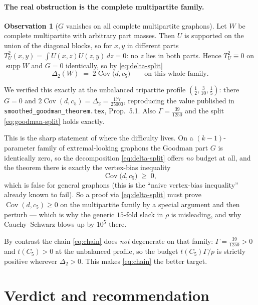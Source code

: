 \documentclass[11pt]{article}
\theoremstyle{definition}
\newtheorem{observation}[theorem]{Observation}
\newcommand{\Cov}{\operatorname{Cov}}
\newcommand{\tu}{T_U}
\begin{document}
\paragraph{The real obstruction is the complete multipartite family.}

\begin{observation}[$G$ vanishes on all complete multipartite graphons]
\label{obs:multipartite}
Let $W$ be complete multipartite with arbitrary part masses.  Then $U$ is
supported on the union of the diagonal blocks, so for $x,y$ in different parts
$\tu^2(x,y)=\int U(x,z)U(z,y)\,dz=0$: no $z$ lies in both parts.  Hence
$\tu^2\equiv0$ on $\operatorname{supp}W$ and $G=0$ identically, so by
\eqref{eq:delta-split}
\[
  \Delta_2(W)\;=\;2\Cov\big(d,c_5\big)\qquad\text{on this whole family.}
\]
\end{observation}

We verified this exactly at the unbalanced tripartite profile
$(\tfrac12,\tfrac3{10},\tfrac15)$: there $G=0$ and
$2\Cov(d,c_5)=\Delta_2=\tfrac{177}{25000}$, reproducing the value published in
\texttt{smoothed\_goodman\_theorem.tex}, Prop.~5.1.  Also
$\Gamma=\tfrac{39}{1250}$ and the split \eqref{eq:goodman-split} holds exactly.

This is the sharp statement of where the difficulty lives.  On a
$(k-1)$-parameter family of extremal-looking graphons the Goodman part $G$ is
identically zero, so the decomposition \eqref{eq:delta-split} offers \emph{no}
budget at all, and the theorem there is exactly the vertex-bias inequality
\[
  \Cov\big(d,c_5\big)\;\ge\;0,
\]
which is false for general graphons (this is the ``naive vertex-bias
inequality'' already known to fail).  So a proof via \eqref{eq:delta-split} must
prove $\Cov(d,c_5)\ge0$ on the multipartite family by a special argument and
then perturb --- which is why the generic $15$-fold slack in $\rho$ is
misleading, and why Cauchy--Schwarz blows up by $10^5$ there.

By contrast the chain \eqref{eq:chain} does \emph{not} degenerate on that
family: $\Gamma=\tfrac{39}{1250}>0$ and $t(C_5)>0$ at the unbalanced profile, so
the budget $t(C_5)\Gamma/p$ is strictly positive wherever $\Delta_2>0$.  This
makes \eqref{eq:chain} the better target.

\section{Verdict and recommendation}\label{sec:verdict}
\end{document}
